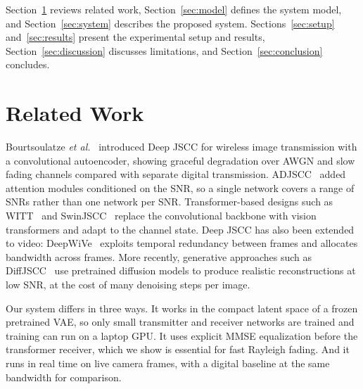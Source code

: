 \documentclass[conference]{IEEEtran}
\begin{document}
Section~\ref{sec:related} reviews related work, Section~\ref{sec:model} defines the system model, and Section~\ref{sec:system} describes the proposed system. Sections~\ref{sec:setup} and~\ref{sec:results} present the experimental setup and results, Section~\ref{sec:discussion} discusses limitations, and Section~\ref{sec:conclusion} concludes.

\section{Related Work}\label{sec:related}
Bourtsoulatze \emph{et al.}~\cite{bourtsoulatze2019deep} introduced Deep JSCC for wireless image transmission with a convolutional autoencoder, showing graceful degradation over AWGN and slow fading channels compared with separate digital transmission. ADJSCC~\cite{xu2022adjscc} added attention modules conditioned on the SNR, so a single network covers a range of SNRs rather than one network per SNR. Transformer-based designs such as WITT~\cite{yang2023witt} and SwinJSCC~\cite{yang2023swinjscc} replace the convolutional backbone with vision transformers and adapt to the channel state. Deep JSCC has also been extended to video: DeepWiVe~\cite{tung2022deepwive} exploits temporal redundancy between frames and allocates bandwidth across frames. More recently, generative approaches such as DiffJSCC~\cite{yang2024diffjscc} use pretrained diffusion models to produce realistic reconstructions at low SNR, at the cost of many denoising steps per image.

Our system differs in three ways. It works in the compact latent space of a frozen pretrained VAE, so only small transmitter and receiver networks are trained and training can run on a laptop GPU. It uses explicit MMSE equalization before the transformer receiver, which we show is essential for fast Rayleigh fading. And it runs in real time on live camera frames, with a digital baseline at the same bandwidth for comparison.

\end{document}
